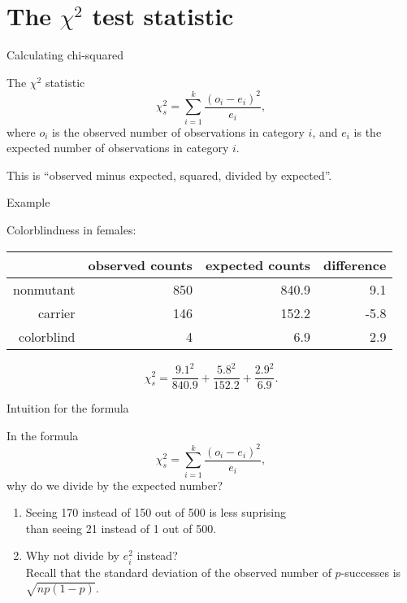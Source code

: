 \section{The $\chi^2$ test statistic}

\begin{frame}{Calculating chi-squared}

    \begin{block}{The $\chi^2$ statistic}
        \[ \chi^2_s = \sum_{i=1}^k \frac{(o_i - e_i)^2}{e_i} , \]
        where $o_i$ is the observed \alert{number} of observations in category $i$,
        and $e_i$ is the expected \alert{number} of observations in category $i$.
    \end{block}


    \vspace{2em}

    This is \alert{``observed minus expected, squared, divided by expected''}.


\end{frame}


\begin{frame}{Example}

    Colorblindness in females:
    \begin{center}
        \begin{tabular}{r|rrr}
            & observed counts & expected counts & difference\\
            \hline 
            nonmutant & 850 & 840.9 & 9.1 \\ 
            carrier &  146 & 152.2 & -5.8 \\ 
            colorblind & 4 & 6.9 & 2.9  \\
        \end{tabular}
    \end{center}

    \vspace{2em}

    \[
        \chi^2_s = \frac{9.1^2}{840.9} + \frac{5.8^2}{152.2} + \frac{2.9^2}{6.9} .
    \]

\end{frame}


\begin{frame}{Intuition for the formula}

    In the formula
        \[ \chi^2_s = \sum_{i=1}^k \frac{(o_i - e_i)^2}{e_i} , \]
    why do we divide by the expected number?

    \vspace{2em} \pause

    \begin{enumerate}
        \item Seeing 170 instead of 150 out of 500 is less suprising \\
            than seeing 21 instead of 1 out of 500.
        \item Why not divide by $e_i^2$ instead? \\
            Recall that the standard deviation of the observed number of $p$-successes is $\sqrt{n p(1-p) }$.
    \end{enumerate}

\end{frame}



